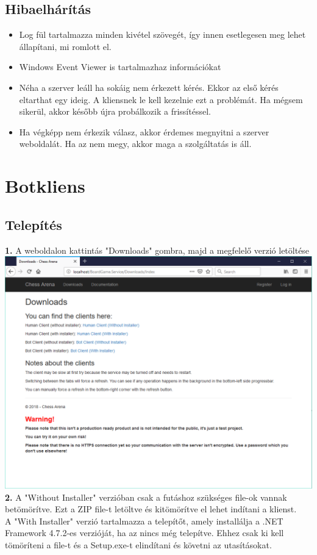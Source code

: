 \documentclass[twoside, a4paper, 12pt]{book}
\begin{document}
\section{Hibaelhárítás}
\begin{itemize}
	\item Log fül tartalmazza minden kivétel szövegét, így innen esetlegesen meg lehet állapítani, mi romlott el.
	\item Windows Event Viewer is tartalmazhaz információkat
	\item Néha a szerver leáll ha sokáig nem érkezett kérés. Ekkor az első kérés eltarthat egy ideig. A kliensnek le kell kezelnie ezt a problémát. Ha mégsem sikerül, akkor később újra probálkozik a frissítéssel.
	\item Ha végképp nem érkezik válasz, akkor érdemes megnyitni a szerver weboldalát. Ha az nem megy, akkor maga a szolgáltatás is áll.
\end{itemize}
	

\chapter{Botkliens}
\section{Telepítés}
\noindent \textbf{1.} A weboldalon kattintás "Downloads" gombra, majd a megfelelő verzió letöltése \\
\includegraphics[width=1.0\textwidth]{img/service_downloads.png} \\
\noindent \textbf{2.} A "Without Installer" verzióban csak a futáshoz szükséges file-ok vannak betömörítve. Ezt a ZIP file-t letöltve és kitömörítve el lehet indítani a klienst. \\
A "With Installer" verzió tartalmazza a telepítőt, amely installálja a .NET Framework 4.7.2-es verzióját, ha az nincs még telepítve. Ehhez csak ki kell tömöríteni a file-t és a Setup.exe-t elindítani és követni az utasításokat.
\end{document}
